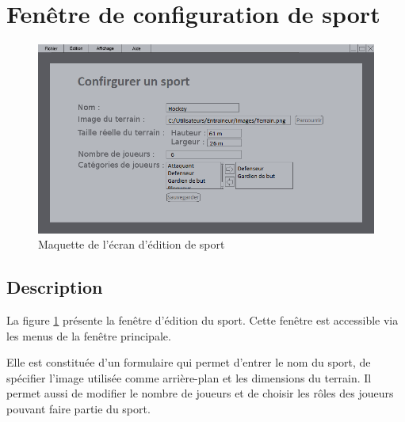\section{Fenêtre de configuration de sport}

\begin{figure}[H]
	\centering
	\includegraphics[width=\textwidth]{mockup/mockupSport.png}
	\caption{Maquette de l'écran d'édition de sport}
	\label{fig:mock-up-sport}
\end{figure}

\subsection{Description}

La figure \ref{fig:mock-up-sport} présente la fenêtre d'édition du sport. Cette fenêtre est accessible via les menus de la fenêtre principale.

Elle est constituée d'un formulaire qui permet d'entrer le nom du sport, de spécifier l'image utilisée comme arrière-plan et les dimensions du terrain. Il permet aussi de modifier le nombre de joueurs et de choisir les rôles des joueurs pouvant faire partie du sport.